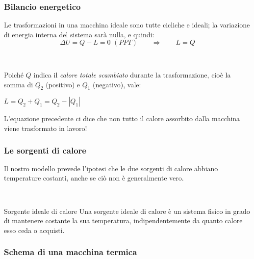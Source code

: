 \documentclass[]{beamer}
\theoremstyle{plain}
\begin{document}
\begin{frame}
  \frametitle{Bilancio energetico}
  Le trasformazioni in una macchina ideale sono tutte cicliche e ideali; la variazione di energia interna del sistema sarà nulla, e quindi:
  \[ \Delta U = Q - L = 0 \,\,(PPT) \qquad\Longrightarrow\qquad L = Q \]\pause

  ~
  
  Poiché $ Q $ indica il \emph{calore totale scambiato} durante la trasformazione, cioè la somma di $ Q_2 $ (positivo) e $ Q_1 $ (negativo), vale:
    \begin{center}
\colorbox{blue!30}{$ L = Q_2 + Q_1 = Q_2 - |Q_1| $}
\end{center}\pause
  L'equazione precedente ci dice che \alert{non tutto il calore assorbito dalla macchina viene trasformato in lavoro}!
\end{frame}


\begin{frame}
\frametitle{Le sorgenti di calore}
Il nostro modello prevede l'ipotesi che le due sorgenti di calore abbiano \alert{temperature costanti}, anche se ciò non è generalmente vero.\pause

~

\begin{block}{Sorgente ideale di calore}
Una sorgente ideale di calore è un sistema fisico in grado di mantenere costante la sua temperatura, indipendentemente da quanto calore esso ceda o acquisti.
\end{block}
\end{frame}






\begin{frame}
\frametitle{Schema di una macchina termica}
\begin{figure}
\end{figure}
\end{frame}
\end{document}
